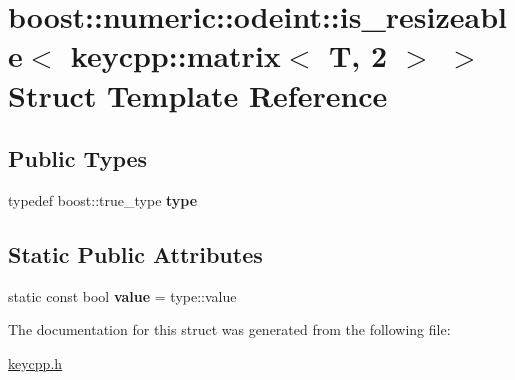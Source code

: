 \hypertarget{structboost_1_1numeric_1_1odeint_1_1is__resizeable_3_01keycpp_1_1matrix_3_01_t_00_012_01_4_01_4}{\section{boost\-:\-:numeric\-:\-:odeint\-:\-:is\-\_\-resizeable$<$ keycpp\-:\-:matrix$<$ T, 2 $>$ $>$ Struct Template Reference}
\label{structboost_1_1numeric_1_1odeint_1_1is__resizeable_3_01keycpp_1_1matrix_3_01_t_00_012_01_4_01_4}
}
\subsection*{Public Types}
\begin{DoxyCompactItemize}
\item 
\hypertarget{structboost_1_1numeric_1_1odeint_1_1is__resizeable_3_01keycpp_1_1matrix_3_01_t_00_012_01_4_01_4_a4d549d1550d19b6be904aa97edd0cb79}{typedef boost\-::true\-\_\-type {\bfseries type}}\label{structboost_1_1numeric_1_1odeint_1_1is__resizeable_3_01keycpp_1_1matrix_3_01_t_00_012_01_4_01_4_a4d549d1550d19b6be904aa97edd0cb79}

\end{DoxyCompactItemize}
\subsection*{Static Public Attributes}
\begin{DoxyCompactItemize}
\item 
\hypertarget{structboost_1_1numeric_1_1odeint_1_1is__resizeable_3_01keycpp_1_1matrix_3_01_t_00_012_01_4_01_4_a4723f948d595b03a70ef4447e460ce54}{static const bool {\bfseries value} = type\-::value}\label{structboost_1_1numeric_1_1odeint_1_1is__resizeable_3_01keycpp_1_1matrix_3_01_t_00_012_01_4_01_4_a4723f948d595b03a70ef4447e460ce54}

\end{DoxyCompactItemize}


The documentation for this struct was generated from the following file\-:\begin{DoxyCompactItemize}
\item 
\hyperlink{keycpp_8h}{keycpp.\-h}\end{DoxyCompactItemize}
